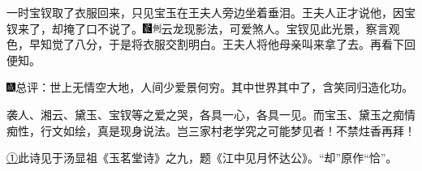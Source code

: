 一时宝钗取了衣服回来，只见宝玉在王夫人旁边坐着垂泪。王夫人正才说他，因宝钗来了，却掩了口不说了。{\includegraphics[width=3mm]{../Images/00006}\includegraphics[width=3mm]{../Images/00011}\footnotesize \kaishu 云龙现影法，可爱煞人。}宝钗见此光景，察言观色，早知觉了八分，于是将衣服交割明白。王夫人将他母亲叫来拿了去。再看下回便知。

{\includegraphics[width=3mm]{../Images/00005}总评：世上无情空大地，人间少爱景何穷。其中世界其中了，含笑同归造化功。}

{袭人、湘云、黛玉、宝钗等之爱之哭，各具一心，各具一见。而宝玉、黛玉之痴情痴性，行文如绘，真是现身说法。岂三家村老学究之可能梦见者！不禁炷香再拜！}

{\href{../Text/part0036_split_000.html\#navto_1_a}{①}此诗见于汤显祖《玉茗堂诗》之九，题《江中见月怀达公》。``却''原作``恰''。}
